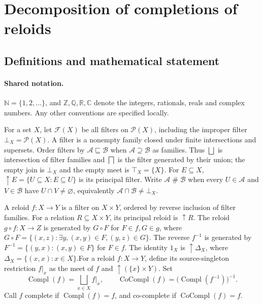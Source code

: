 \documentclass[11pt]{article}
\begin{document}
\section{Decomposition of completions of reloids}\label{statement}

\subsection{Definitions and mathematical statement}

\paragraph{Shared notation.}$\mathbb N=\{1,2,\ldots\}$, and $\mathbb Z,\mathbb Q,\mathbb R,\mathbb C$ denote the integers, rationals, reals and complex numbers. Any other conventions are specified locally.


For a set $X$, let $\mathcal F(X)$ be all filters on $\mathcal P(X)$, including the improper filter $\bot_X=\mathcal P(X)$. A filter is a nonempty family closed under finite intersections and supersets. Order filters by $\mathcal A\sqsubseteq\mathcal B$ when $\mathcal A\supseteq\mathcal B$ as families. Thus $\bigsqcup$ is intersection of filter families and $\bigsqcap$ is the filter generated by their union; the empty join is $\bot_X$ and the empty meet is $\top_X=\{X\}$. For $E\subseteq X$, $\uparrow E=\{U\subseteq X:E\subseteq U\}$ is its principal filter. Write $\mathcal A\mathrel{\#}\mathcal B$ when every $U\in\mathcal A$ and $V\in\mathcal B$ have $U\cap V\ne\varnothing$, equivalently $\mathcal A\sqcap\mathcal B\ne\bot_X$.

A reloid $f:X\to Y$ is a filter on $X\times Y$, ordered by reverse inclusion of filter families. For a relation $R\subseteq X\times Y$, its principal reloid is $\uparrow R$. The reloid $g\circ f:X\to Z$ is generated by $G\circ F$ for $F\in f,G\in g$, where $G\circ F=\{(x,z):\exists y,(x,y)\in F,(y,z)\in G\}$. The reverse $f^{-1}$ is generated by $F^{-1}=\{(y,x):(x,y)\in F\}$ for $F\in f$. The identity $1_X$ is $\uparrow\Delta_X$, where $\Delta_X=\{(x,x):x\in X\}$.For a reloid $f:X\to Y$, define its source-singleton restriction $f|_x$ as the meet of $f$ and $\uparrow(\{x\}\times Y)$. Set
\[
 \operatorname{Compl}(f)=\bigsqcup_{x\in X}f|_x,
 \qquad \operatorname{CoCompl}(f)=\bigl(\operatorname{Compl}(f^{-1})\bigr)^{-1}.
\]
Call $f$ complete if $\operatorname{Compl}(f)=f$, and co-complete if $\operatorname{CoCompl}(f)=f$.
\end{document}
